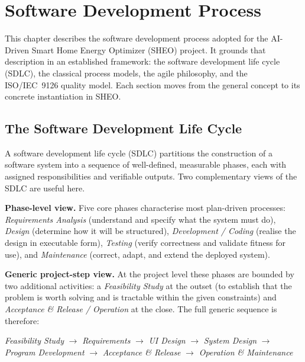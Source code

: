 \chapter{Software Development Process}

This chapter describes the software development process adopted for the AI-Driven Smart Home
Energy Optimizer (SHEO) project. It grounds that description in an established framework: the
software development life cycle (SDLC), the classical process models, the agile philosophy,
and the ISO/IEC~9126 quality model. Each section moves from the general concept to its
concrete instantiation in SHEO.

\section{The Software Development Life Cycle}
\label{sec:sdlc}

A software development life cycle (SDLC) partitions the construction of a software system
into a sequence of well-defined, measurable phases, each with assigned responsibilities and
verifiable outputs. Two complementary views of the SDLC are useful here.

\textbf{Phase-level view.} Five core phases characterise most plan-driven processes:
\textit{Requirements Analysis} (understand and specify what the system must do),
\textit{Design} (determine how it will be structured),
\textit{Development / Coding} (realise the design in executable form),
\textit{Testing} (verify correctness and validate fitness for use), and
\textit{Maintenance} (correct, adapt, and extend the deployed system).

\textbf{Generic project-step view.} At the project level these phases are bounded by two
additional activities: a \textit{Feasibility Study} at the outset (to establish that the
problem is worth solving and is tractable within the given constraints) and
\textit{Acceptance \& Release / Operation} at the close. The full generic sequence is
therefore:

\begin{center}
\textit{Feasibility Study}
$\rightarrow$ \textit{Requirements}
$\rightarrow$ \textit{UI Design}
$\rightarrow$ \textit{System Design}
$\rightarrow$ \textit{Program Development}
$\rightarrow$ \textit{Acceptance \& Release}
$\rightarrow$ \textit{Operation \& Maintenance}
\end{center}

